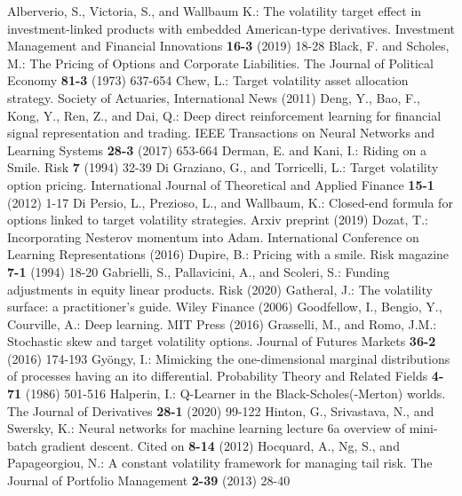 \documentclass[runningheads]{m2ef}
\newcommand{\change}[1]{{\color{red} {#1}}}%
\begin{document}
\begin{thebibliography}{99}
%
%
Alberverio, S., Victoria, S., and Wallbaum K.: The volatility target effect in investment-linked products with embedded American-type derivatives. Investment Management and Financial Innovations {\bf 16-3} (2019) 18-28
%
Black, F. and Scholes, M.: The Pricing of Options and Corporate Liabilities. The Journal of Political Economy {\bf 81-3} (1973) 637-654
%
Chew, L.: Target volatility asset allocation strategy. Society of Actuaries, International News (2011)
%
Deng, Y., Bao, F., Kong, Y., Ren, Z., and Dai, Q.: Deep direct reinforcement learning for financial signal representation and trading. IEEE Transactions on Neural Networks and Learning Systems {\bf 28-3} (2017) 653-664 
%
Derman, E. and Kani, I.: Riding on a Smile. Risk {\bf 7} (1994) 32-39
%
Di Graziano, G., and Torricelli, L.: Target volatility option pricing. International Journal of Theoretical and Applied Finance {\bf 15-1} (2012) 1-17
%
Di Persio, L.,  Prezioso, L., and Wallbaum, K.: Closed-end formula for options linked to target volatility strategies. Arxiv preprint (2019)
%
Dozat, T.: Incorporating Nesterov momentum into Adam. International Conference on Learning Representations (2016)
%
Dupire, B.: Pricing with a smile. Risk magazine {\bf 7-1} (1994) 18-20
%
Gabrielli, S., Pallavicini, A., and Scoleri, S.: Funding adjustments in equity linear products. Risk (2020)
%
\change{Gatheral, J.: The volatility surface: a practitioner's guide. Wiley Finance (2006)}
%
\change{Goodfellow, I., Bengio, Y., Courville, A.: Deep learning. MIT Press (2016)}
%
Grasselli, M., and Romo, J.M.: Stochastic skew and target volatility options. Journal of Futures Markets {\bf 36-2} (2016) 174-193
%
Gy\"ongy, I.: Mimicking the one-dimensional marginal distributions of processes having an ito differential. Probability Theory and Related Fields {\bf 4-71} (1986) 501-516
%
Halperin, I.: Q-Learner in the Black-Scholes(-Merton) worlds. The Journal of Derivatives {\bf 28-1} (2020) 99-122
%
Hinton, G., Srivastava, N., and Swersky, K.: Neural networks for machine learning lecture 6a overview of mini-batch gradient descent. Cited on {\bf 8-14} (2012)
%
Hocquard, A., Ng, S., and Papageorgiou, N.: A constant volatility framework for managing tail risk. The Journal of Portfolio Management {\bf 2-39} (2013) 28-40

\end{thebibliography}
\end{document}

